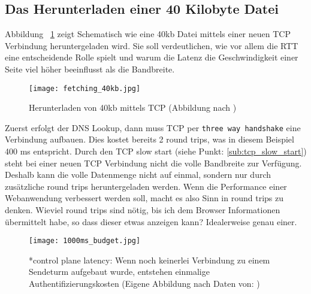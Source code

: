 
	\subsection{Das Herunterladen einer 40 Kilobyte Datei} %
	\label{sub:das_herunterladen_einer_40_kb_datei}

		Abbildung ~\ref{fig:fetching_40kb} zeigt Schematisch wie eine 40kb Datei mittels einer neuen TCP Verbindung heruntergeladen wird. Sie soll verdeutlichen, wie vor allem die RTT eine entscheidende Rolle spielt und warum die Latenz die Geschwindigkeit einer Seite viel höher beeinflusst als die Bandbreite.

		\begin{figure}[htbp]
			\begin{center}
				\texttt{[image: fetching\_40kb.jpg]}
				\caption{Herunterladen von 40kb mittels TCP (Abbildung nach \autocite{grigorikTCP})}
				\label{fig:fetching_40kb}
			\end{center}
		\end{figure}

		Zuerst erfolgt der DNS Lookup, dann muss TCP per \texttt{three way handshake} eine Verbindung aufbauen. Dies kostet bereits 2 round trips, was in diesem Beispiel 400 ms entspricht.
		Durch den TCP slow start (siehe Punkt: \ref{sub:tcp_slow_start}) steht bei einer neuen TCP Verbindung nicht die volle Bandbreite zur Verfügung. Deshalb kann die volle Datenmenge nicht auf einmal, sondern nur durch zusätzliche round trips heruntergeladen werden. Wenn die Performance einer Webanwendung verbessert werden soll, macht es also Sinn in round trips zu denken. Wieviel round trips sind nötig, bis ich dem Browser Informationen übermittelt habe, so dass dieser etwas anzeigen kann? Idealerweise genau einer. 
		
		\begin{figure}[htbp]
			\begin{center}
				\texttt{[image: 1000ms\_budget.jpg]}
				\caption{*control plane latency: Wenn noch keinerlei Verbindung zu einem Sendeturm aufgebaut wurde, entstehen einmalige Authentifizierungskosten (Eigene Abbildung nach Daten von: \autocite{venturebeat}\autocite[p. 7, 12]{grigorikRadio})}
				\label{fig:1000ms_budget}
			\end{center}
		\end{figure}

